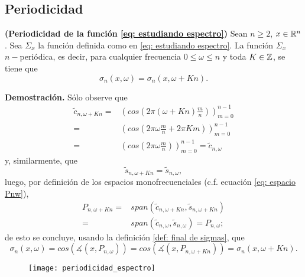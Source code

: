 \subsection{Periodicidad}
\begin{prop}
\label{prop: periodicidad espectro}
\textbf{(Periodicidad de la función \eqref{eq: estudiando espectro})}
Sean $n \geq 2$, $x \in \mathbb{R}^{n}$.
Sea $\Sigma_{x}$ la función definida como en 
\eqref{eq: estudiando espectro}. La función 
$\Sigma_{x}$ $n-$periódica, es decir, 
para cualquier frecuencia
$0 \leq \omega \leq n$
y toda $K \in \mathbb{Z}$, se tiene que 
\[
\sigma_{n}(x, \omega) = \sigma_{n}(x, \omega + Kn).
\]
\end{prop}
\noindent
\textbf{Demostración.}
Sólo observe que 
\begin{align*}
\tilde{c}_{n, \omega + Kn} = & \left( cos \left( 2 \pi
\left( \omega + Kn \right) \frac{m}{n} \right) \right)_{m=0}^{n-1} \\
= & \left( cos \left( 
2 \pi \omega \frac{m}{n} + 2 \pi K m
\right) \right)_{m=0}^{n-1} \\
= & \left( cos \left( 
2 \pi \omega \frac{m}{n}
\right) \right)_{m=0}^{n-1} = \tilde{c}_{n, \omega}
\end{align*}
y, similarmente, que 
\[
\tilde{s}_{n, \omega + Kn} = \tilde{s}_{n, \omega},
\]
luego, por definición de los espacios monofrecuenciales
(c.f. ecuación \ref{eq: espacio Pnw}),
\begin{align*}
P_{n, \omega + Kn} =
& span(\tilde{c}_{n, \omega + Kn}, \tilde{s}_{n, \omega + Kn}) \\
= & span(\tilde{c}_{n, \omega }, \tilde{s}_{n, \omega }) = P_{n, \omega};
\end{align*}
de esto se concluye, usando la definición
\ref{def: final de sigmas},
que 
\[
\sigma_{n}(x, \omega) = 
cos (\measuredangle(x, P_{n, \omega}))
= cos (\measuredangle(x, P_{n, \omega + Kn})) = 
\sigma_{n}(x, \omega + Kn).
\]
\QEDB
\vspace{0.2cm}

\begin{figure}[H]
	\centering
	\texttt{[image: periodicidad\_espectro]} 
\end{figure}	


